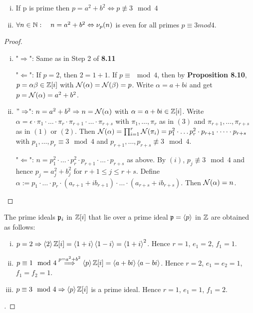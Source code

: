 \begin{Kor}[Fermat]
	\begin{enumerate}[(i)]
		\item If p is prime then $p = a^2 + b^2 \Leftrightarrow p \not\equiv 3 \mod 4$
		
		\item $\forall n \in \mathbb{N}: \quad n = a^2+b^2 \Leftrightarrow \nu_p(n) $ is even for all primes $p \equiv 3 mod 4$.
	\end{enumerate}
\end{Kor}
\begin{proof}
	\begin{enumerate}[(i)]
		\item "$\Rightarrow$": Same as in Step 2 of \textbf{8.11}
		
		"$\Leftarrow$": If $p = 2$, then $2 = 1+1$. If $p \equiv \mod 4$, then by \textbf{Proposition 8.10}, $p = \alpha\beta \in \mathbb{Z}[i]$ with $\operatorname{\mathcal{N}}(\alpha) = \operatorname{\mathcal{N}}(\beta) = p$. Write $\alpha = a +bi$ and get $p = \operatorname{\mathcal{N}}(\alpha) = a^2 + b^2$.
		
		\item $"\Rightarrow$": $n = a^2+b^2 \Rightarrow n = \operatorname{\mathcal{N}}(\alpha)$ with $\alpha = a+bi \in \mathbb{Z}[i]$. Write $\alpha = \epsilon \cdot \pi_1 \cdot \dots \cdot \pi_r \cdot \pi_{r+1}\cdot \dots \cdot \pi_{r+s}$ with $\pi_1, \dots, \pi_r$ as in $(3)$ and $\pi_{r+1}, \dots, \pi_{r+s}$ as in $(1)$ or $(2)$. Then $\operatorname{\mathcal{N}}(\alpha) = \prod_{i=1}^r \operatorname{\mathcal{N}}(\pi_i) = p_1^2 \cdot \dots p_r^2 \cdot p_{r+1} \cdot \dots \cdot p_{r+s}$ with $p_1, \dots, p_r \equiv 3 \mod 4$ and $p_{r+1}, \dots, p_{r+s} \not\equiv 3 \mod 4$.
		
		"$\Leftarrow$": $n = p_1^2 \cdot \dots \cdot p_r^2 \cdot p_{r+1} \cdot \dots \cdot p_{r+s}$ as above. By $(i)$, $p_j \not\equiv 3 \mod 4$ and hence $p_j = a_j^2+b_j^2$ for $r+1 \leq j \leq r+s$. Define $\alpha := p_1 \cdot \dots \cdot p_r \cdot (a_{r+1}+ib_{r+1})  \cdot \dots \cdot (a_{r+s} + ib_{r+s})$. Then $\operatorname{\mathcal{N}}(\alpha) = n$.
	\end{enumerate}
\end{proof}

\begin{Kor}
	The prime ideals $\mathfrak{p}_i$ in $\mathbb{Z}[i]$ that lie over a prime ideal $\mathfrak{p} = \left\langle {p} \right\rangle$ in $\mathbb{Z}$ are obtained as follows:
	\begin{enumerate}[(i)]
		\item $p = 2 \Rightarrow \left\langle {2} \right\rangle\mathbb{Z}[i] = \left\langle {1+i} \right\rangle\left\langle {1-i} \right\rangle = \left\langle {1+i} \right\rangle^2$. Hence $r = 1$, $e_1 = 2$, $f_1 = 1$.
		
		\item $p \equiv 1 \mod 4 \overset{p = a^2+b^2}{\Longrightarrow} \left\langle {p} \right\rangle\mathbb{Z}[i] = \left\langle {a+bi} \right\rangle\left\langle {a-bi} \right\rangle$. Hence $r = 2$, $e_1 = e_2 =  1$, $f_1 = f_2 = 1$.
		
		\item $p \equiv 3 \mod 4 \Rightarrow \left\langle {p} \right\rangle\mathbb{Z}[i]$ is a prime ideal. Hence $r = 1$, $e_1 = 1$, $f_1 = 2$.
	\end{enumerate}
\end{Kor}
\begin{proof}[]
\end{proof}

